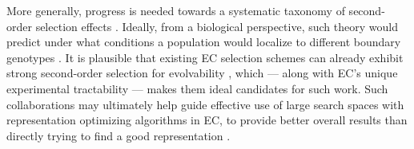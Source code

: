 More generally, progress is needed towards a systematic taxonomy of second-order selection effects \citep{gajewski2019evolvability,mengistu2016evolvability,hu2010evolvability}.
Ideally, from a biological perspective, such theory would predict under what conditions a population would localize to different boundary genotypes \citep{kussell2006polymerpopulation}.
It is plausible that existing EC selection schemes can already exhibit strong second-order selection for evolvability \citep{hu2010evolvability,doncieux2020novelty,lehman2015enhancing}, which --- along with EC's unique experimental tractability --- makes them ideal candidates for such work.
Such collaborations may ultimately help guide effective use of large search spaces with representation optimizing algorithms in EC, to provide better overall results than directly trying to find a good representation \citep{hewlett2008optimization,gajewski2019evolvability,mengistu2016evolvability}.
